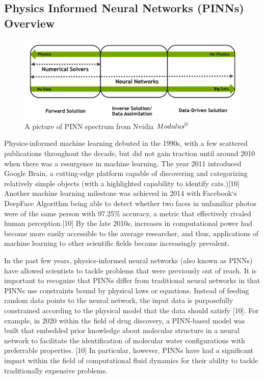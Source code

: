\documentclass{article}
\begin{document}
\pagebreak
\subsection{Physics Informed Neural Networks (PINNs) Overview}
\label{PINN}

\begin{figure}[ht!]
	\centering

	\includegraphics[scale=0.4]{./images/ai_in_computational_sciences_spectrum.png}
	\caption{A picture of PINN spectrum from Nvidia
		$Modulus^{\copyright}$ \cite{NVIDIA}}
	\label{fig:PINN_spectrum}
\end{figure}

%   

Physics-informed machine learning debuted in the 1990s, with a few
scattered publications throughout the decade, but did not gain traction until
around 2010 when there was a resurgence in machine learning. The year 2011
introduced Google Brain, a cutting-edge platform capable of discovering and
categorizing relatively simple objects (with a highlighted capability to
identify cats.)[10] Another machine learning milestone was achieved in 2014
with Facebook`s DeepFace Algorithm being able to detect whether two faces in
unfamiliar photos were of the same person with 97.25\% accuracy, a metric that
effectively rivaled human perception.[10] By the late 2010s, increases in
computational power had become more easily accessible to the average
researcher, and thus, applications of machine learning to other scientific
fields became increasingly prevalent.

In the past few years, physics-informed neural networks (also known as
PINNs) have allowed scientists to tackle problems that were previously out of
reach. It is important to recognize that PINNs differ from traditional neural
networks in that PINNs use constraints bound by physical laws or equations.
Instead of feeding random data points to the neural network, the input data is
purposefully constrained according to the physical model that the data should
satisfy [10]. For example, in 2020 within the field of drug discovery, a
PINN-based model was built that embedded prior knowledge about molecular
structure in a neural network to facilitate the identification of molecular
water configurations with preferrable properties. [10] In particular, however,
PINNs have had a significant impact within the field of computational fluid
dynamics for their ability to tackle traditionally expensive problems.
\cite{PINN_History}
\end{document}
